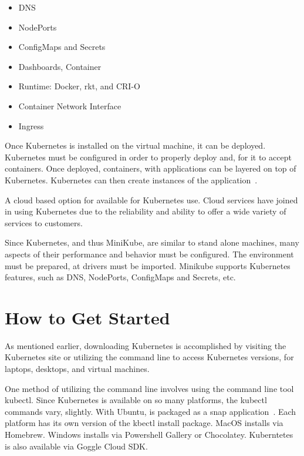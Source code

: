 \begin{itemize}
    \item DNS 
    
    \item NodePorts 
    
    \item ConfigMaps and Secrets 
    
    \item Dashboards, Container 
    
    \item Runtime:  Docker, rkt, and CRI-O 
    
    \item Container Network Interface
    
    \item Ingress  
 \end{itemize}   
 
Once Kubernetes is installed on the virtual machine, it can be
deployed.  Kubernetes must be configured in order to properly deploy
and, for it to accept containers.  Once deployed, containers, with
applications can be layered on top of Kubernetes.  Kubernetes can then
create instances of the application~\cite{concept}.

A cloud based option for available for Kubernetes use.  Cloud services 
have joined in using Kubernetes due to the reliability and ability to
offer a wide variety of services to customers.   

Since Kubernetes, and thus MiniKube, are similar to stand alone
machines, many aspects of their performance and behavior must be
configured.  The environment must be prepared, at drivers must be 
imported.  Minikube supports Kubernetes
features, such as DNS, NodePorts, ConfigMaps and Secrets, etc.   

\section{How to Get Started}

As mentioned earlier, downloading Kubernetes is accomplished by
visiting the Kubernetes site or utilizing the command line to access
Kubernetes versions, for laptops, desktops, and virtual machines.  

One method of utilizing the command line involves using the command
line tool kubectl.  Since Kubernetes is available on so many
platforms, the kubectl commands vary, slightly.  With Ubuntu, is
packaged as a snap application~\cite{kubectl}.  Each platform has
its own version of the kbectl install package.  MacOS installs via
Homebrew.  Windows installs via Powershell Gallery or Chocolatey.
Kuberntetes is also available via Goggle Cloud SDK\cite{kubectl}.\

